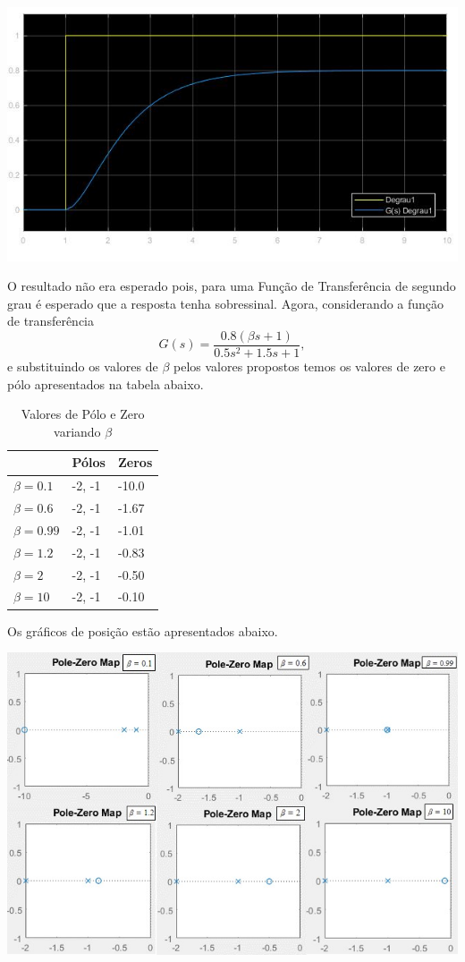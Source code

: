 \documentclass[
]{book}
\theoremstyle{definition}
\theoremstyle{definition}
\theoremstyle{definition}
\theoremstyle{remark}
\begin{document}
\includegraphics{imagens/Lab2/prob41.jpg}

O resultado não era esperado pois, para uma Função de Transferência de segundo grau é esperado que a resposta tenha sobressinal. Agora, considerando a função de transferência
\[
G(s) = \frac {0.8(\beta s+1)}{0.5s^2+1.5s+1},
\]
e substituindo os valores de \(\beta\) pelos valores propostos temos os valores de zero e pólo apresentados na tabela abaixo.

\begin{table}

\caption{\label{tab:unnamed-chunk-6}Valores de Pólo e Zero variando $\beta$}
\centering
\begin{tabular}[t]{lll}
\toprule
  & Pólos & Zeros\\
\midrule
$\beta = 0.1$ & {-2, -1} & -10.0\\
$\beta = 0.6$ & {-2, -1} & -1.67\\
$\beta = 0.99$ & {-2, -1} & -1.01\\
$\beta = 1.2$ & {-2, -1} & -0.83\\
$\beta = 2$ & {-2, -1} & -0.50\\
\addlinespace
$\beta = 10$ & {-2, -1} & -0.10\\
\bottomrule
\end{tabular}
\end{table}

Os gráficos de posição estão apresentados abaixo.

\includegraphics{Imagens/Lab2/prob4Varios.jpg}
\end{document}
